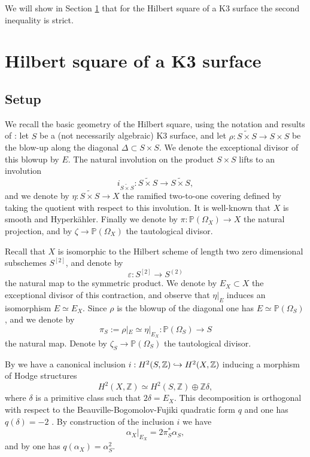 \documentclass[11pt]{article}
\newcommand\hto{\mathrel{\lhook\joinrel\to}}
\theoremstyle{plain}
\theoremstyle{definition}
\newcommand{\Z}{\ensuremath{\mathbb{Z}}}
\newcommand{\PP}{\ensuremath{\mathbb{P}}}
\newcommand{\holom}[3]{\ensuremath{#1:#2\to #3}}
\newcommand{\blS}{\ensuremath{\widetilde{S \times S}}}
\begin{document}
We will show in Section \ref{sectionK3square} that for the Hilbert square of a K3 surface the second inequality is strict.

\section{Hilbert square of a K3 surface} \label{sectionK3square}

\subsection{Setup}
\label{subsectionsetup}

We recall the basic geometry of the Hilbert square, using the notation and results of \cite[\S 6]{Bea83}:
let $S$ be a (not necessarily algebraic) K3 surface, and let $\holom{\rho}{\widetilde{S \times S}}{S \times S}$ be the blow-up along the diagonal $\Delta \subset S \times S$. We denote the exceptional divisor of this blowup by $E$.
The natural involution on the product $S \times S$ lifts to an involution
\[
i_{\blS}: \blS \to \blS,
\]
and we denote by
$\holom{\eta}{\blS}{X}$ the ramified two-to-one covering defined by taking the quotient with respect to this involution.
It is well-known that $X$ is smooth and Hyperkähler.
Finally we denote by $\holom{\pi}{\PP(\Omega_X)}{X}$ the natural projection, and by $\zeta \to \PP(\Omega_X)$
the tautological divisor.

Recall that $X$ is isomorphic to the Hilbert scheme of length two zero dimensional subschemes $S^{[2]}$, and denote by
\[
\holom{\varepsilon}{S^{[2]}}{S^{(2)}}
\]
the natural map to the symmetric product. We denote by $E_X \subset X$ the exceptional
divisor of this contraction, and observe that $\eta|_E$ induces an isomorphism $E \simeq E_X$.
Since $\rho$ is the blowup of the diagonal one has
$E \simeq \PP(\Omega_S)$, and we denote by
\[
\pi_S:= \rho|_E \simeq \eta|_{E_X}: \PP(\Omega_S) \to S
\]
the natural map. Denote by $\zeta_S \to \PP(\Omega_S)$ the tautological divisor.

By \cite[\S 6, Prop.\,6]{Bea83} we have a canonical inclusion
$i: H^2(S, \Z) \hto H^2(X, \Z)$ inducing a morphism of Hodge structures
\[
H^2(X, \Z) \simeq H^2(S, \Z) \oplus \Z \delta,
\]
where $\delta$ is a primitive class such that $2 \delta = E_X$.
This decomposition is orthogonal with respect to the Beauville-Bogomolov-Fujiki quadratic form $q$ \cite[\S 9, Lem.\,1]{Bea83}
and one has $q(\delta)=-2$ \cite[\S 1, Rem.\,1]{Bea83}.
By construction of the inclusion $i$ \cite[\S 6, Prop.\,6]{Bea83}
we have
\begin{equation} \label{restrictalphaX}
\alpha_X|_{E_X} = 2 \pi_S^* \alpha_S,
\end{equation}
and by \cite[\S 9, Rem.\,1]{Bea83} one has $q(\alpha_X)=\alpha_S^2$.
\end{document}
